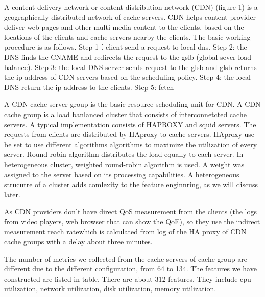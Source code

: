 \documentclass[5p]{elsarticle}
\newcommand{\dabiaolv}{reach rate}
\begin{document}
A content delivery network or content distribution network (CDN) (figure 1) is a geographically distributed network of cache servers. CDN helps content provider deliver web pages and other multi-media content to the clients, based on the locations of the clients and cache servers nearby the clients. The basic working procedure is as follows. Step 1：client send a request to local dns. Step 2: the DNS finds the CNAME and redirects the request to the gslb (global sever load balance). Step 3: the local DNS server sends request to the glsb and glsb returns the ip address of CDN servers based on the scheduling policy. Step 4: the local DNS return the ip address to the clients. Step 5: fetch 


A CDN cache server group is the basic resource scheduling unit for CDN. A CDN cache group is a load banlanced cluster that consists of interconnetcted cache servers. A typical implementation consists of HAPROXY and squid servers. The requests from clients are distributed by HAproxy to cache servers. HAproxy use be set to use different algorithms algorithms to maximize the utilization of every server. Round-robin algorithm distributes the load equally to each server. In heterogeneous cluster,  weighted round-robin algorithm is used. A weight was assigned to the server based on its processing capabilities. A heterogeneous strucutre of a cluster adds comlexity to the feature enginnring, as we will discuss later. 

As CDN providers don't have direct QoS measurement from the clients (the logs from video players, web browser that can show the QoE), so they use the indirect measurement \dabiaolv which is calculated from log of the HA proxy of CDN cache groups with a delay about three minutes. 

The number of metrics we collected from the cache servers of cache group are different due to the different configuration, from 64 to 134. The features we have constructed are listed in table. There are about 312 features. They include cpu utilization, network utilization, disk utilization, memory utilization.
\end{document}
